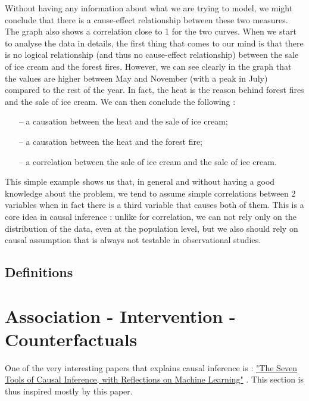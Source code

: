 \documentclass{article}
\begin{document}
Without having any information about what we are trying to model, we might conclude that there is a cause-effect relationship between these two measures. The graph also shows a correlation close to 1 for the two curves. When we start to analyse the data in details, the first thing that comes to our mind is that there is no logical relationship (and thus no cause-effect relationship) between the sale of ice cream and the forest fires. However, we can see clearly in the graph that the values are higher between May and November (with a peak in July) compared to the rest of the year. In fact, the heat is the reason behind forest fires and the sale of ice cream. We can then conclude the following : 

\begin{itemize}
\item[--] a causation between the heat and the sale of ice cream;
\item[--] a causation between the heat and the forest fire;
\item[--] a correlation between the sale of ice cream and the sale of ice cream.
\end{itemize}

This simple example shows us that, in general and without having a good knowledge about the problem, we tend to assume simple correlations between 2 variables when in fact there is a third variable that causes both of them. This is a core idea in causal inference : unlike for correlation, we can not rely only on the distribution of the data, even at the population level, but we also should rely on causal assumption that is always not testable in observational studies.\cite{pearl2010mathematics} 

\subsection{Definitions}

\section{Association - Intervention - Counterfactuals}

One of the very interesting papers that explains causal inference is : \href{https://cacm.acm.org/magazines/2019/3/234929-the-seven-tools-of-causal-inference-with-reflections-on-machine-learning/fulltext?mobile=false}{"The Seven Tools of Causal Inference, with Reflections on Machine Learning"} \cite{pearl2019seven}. This section is thus inspired mostly by this paper.
\end{document}
